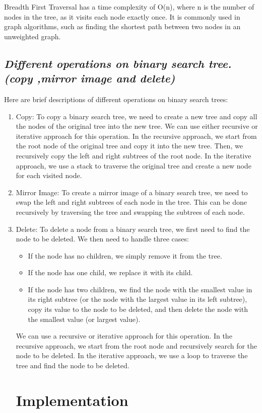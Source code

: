 \documentclass{article}
\begin{document}
Breadth First Traversal has a time complexity of O(n), where n is the number of nodes in the tree, as it visits each node exactly once. It is commonly used in graph algorithms, such as finding the shortest path between two nodes in an unweighted graph.
\subsection{\textbf{\textit{Different operations on binary search tree.(copy ,mirror image and delete)}}}
Here are brief descriptions of different operations on binary search trees:
\begin{enumerate}
	\item Copy: To copy a binary search tree, we need to create a new tree and copy all the nodes of the original tree into the new tree. We can use either recursive or iterative approach for this operation. In the recursive approach, we start from the root node of the original tree and copy it into the new tree. Then, we recursively copy the left and right subtrees of the root node. In the iterative approach, we use a stack to traverse the original tree and create a new node for each visited node.
	\item Mirror Image: To create a mirror image of a binary search tree, we need to swap the left and right subtrees of each node in the tree. This can be done recursively by traversing the tree and swapping the subtrees of each node.
	\item Delete: To delete a node from a binary search tree, we first need to find the node to be deleted. We then need to handle three cases:
	\begin{itemize}
		\item If the node has no children, we simply remove it from the tree.
		\item If the node has one child, we replace it with its child.
		\item If the node has two children, we find the node with the smallest value in its right subtree (or the node with the largest value in its left subtree), copy its value to the node to be deleted, and then delete the node with the smallest value (or largest value).
	\end{itemize}
We can use a recursive or iterative approach for this operation. In the recursive approach, we start from the root node and recursively search for the node to be deleted. In the iterative approach, we use a loop to traverse the tree and find the node to be deleted.
\section{\textbf{Implementation}}

\end{enumerate}
\end{document}

